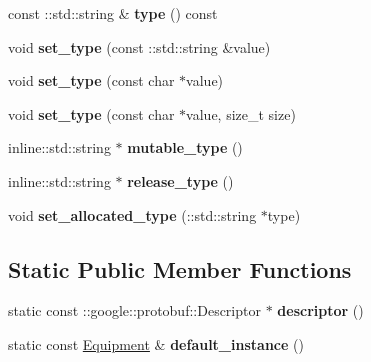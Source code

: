 \begin{DoxyCompactItemize}
\item 
\hypertarget{classexercise__protobuf_1_1_equipment_a9a17d01d878722c16bc41df77b03f075}{}const \+::std\+::string \& {\bfseries type} () const \label{classexercise__protobuf_1_1_equipment_a9a17d01d878722c16bc41df77b03f075}

\item 
\hypertarget{classexercise__protobuf_1_1_equipment_af17c050a48f9d33187c6326a5c6a73c4}{}void {\bfseries set\+\_\+type} (const \+::std\+::string \&value)\label{classexercise__protobuf_1_1_equipment_af17c050a48f9d33187c6326a5c6a73c4}

\item 
\hypertarget{classexercise__protobuf_1_1_equipment_a8ad4e6ef135e301a95549807d862d0e9}{}void {\bfseries set\+\_\+type} (const char $\ast$value)\label{classexercise__protobuf_1_1_equipment_a8ad4e6ef135e301a95549807d862d0e9}

\item 
\hypertarget{classexercise__protobuf_1_1_equipment_adce77f3b469621ebefbb6ccd93ca08fc}{}void {\bfseries set\+\_\+type} (const char $\ast$value, size\+\_\+t size)\label{classexercise__protobuf_1_1_equipment_adce77f3b469621ebefbb6ccd93ca08fc}

\item 
\hypertarget{classexercise__protobuf_1_1_equipment_a168312a2203f7ac090d5b4282bf468af}{}inline\+::std\+::string $\ast$ {\bfseries mutable\+\_\+type} ()\label{classexercise__protobuf_1_1_equipment_a168312a2203f7ac090d5b4282bf468af}

\item 
\hypertarget{classexercise__protobuf_1_1_equipment_a027d7ccf12f075f7a004b6e048a40da0}{}inline\+::std\+::string $\ast$ {\bfseries release\+\_\+type} ()\label{classexercise__protobuf_1_1_equipment_a027d7ccf12f075f7a004b6e048a40da0}

\item 
\hypertarget{classexercise__protobuf_1_1_equipment_a4eaedfe6e67f8ad131d4eb14804b95fe}{}void {\bfseries set\+\_\+allocated\+\_\+type} (\+::std\+::string $\ast$type)\label{classexercise__protobuf_1_1_equipment_a4eaedfe6e67f8ad131d4eb14804b95fe}

\end{DoxyCompactItemize}
\subsection*{Static Public Member Functions}
\begin{DoxyCompactItemize}
\item 
\hypertarget{classexercise__protobuf_1_1_equipment_a2f38981061fdada40a9249d6fd91a61b}{}static const \+::google\+::protobuf\+::\+Descriptor $\ast$ {\bfseries descriptor} ()\label{classexercise__protobuf_1_1_equipment_a2f38981061fdada40a9249d6fd91a61b}

\item 
\hypertarget{classexercise__protobuf_1_1_equipment_a9a202a511ef35f8e584ae395553446b6}{}static const \hyperlink{classexercise__protobuf_1_1_equipment}{Equipment} \& {\bfseries default\+\_\+instance} ()\label{classexercise__protobuf_1_1_equipment_a9a202a511ef35f8e584ae395553446b6}

\end{DoxyCompactItemize}
